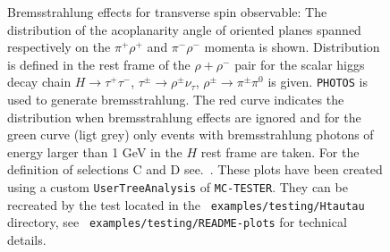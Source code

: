 \documentclass[]{Photos_interface_design}
\begin{document}
\begin{figure}[h!]
\centering
{}
\caption{Bremsstrahlung effects for transverse spin observable: 
  The distribution of the acoplanarity angle of oriented planes spanned respectively on 
  the $\pi^+\rho^+$ and $\pi^-\rho^-$ momenta is shown.  
Distribution is defined in the rest frame of the
  $\rho+ \rho^-$ pair for the scalar higgs decay chain $H\to
  \tau^+\tau^-$, $\tau^\pm \to \rho^\pm \nu_\tau$, $\rho^\pm \to
  \pi^\pm \pi^0$ is given. {\tt PHOTOS} is used to generate
  bremsstrahlung.  The red curve indicates the distribution when
  bremsstrahlung effects are ignored and for the green curve (ligt grey) 
only events
  with bremsstrahlung  photons of energy larger than 1 GeV
  in the $H$ rest frame are taken. For the definition of selections C
  and D see.~\cite{Bower:2002zx,Desch:2003rw}.  These plots have been created using
  a custom {\tt UserTreeAnalysis} of {\tt MC-TESTER}.  They can be
  recreated by  the test located in the {\tt
    examples/testing/Htautau} directory, see {\tt
    examples/testing/README-plots} for technical details.
\label{fig:acoplanarity}
}
\end{figure}
\end{document}
